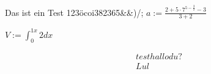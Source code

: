 % 
%
\usepackage{amsmath}
\usepackage{test}


Das ist ein Test 123öcoi382365&&)/;
$a:=\frac{2+5 \cdot{} 7^{5-\frac{3}{2}}-3}{3+2}$

$V := \int_{0}^{1 x}2dx$

\begin{align}
    test hallo du?\\
    Lul
\end{align}





